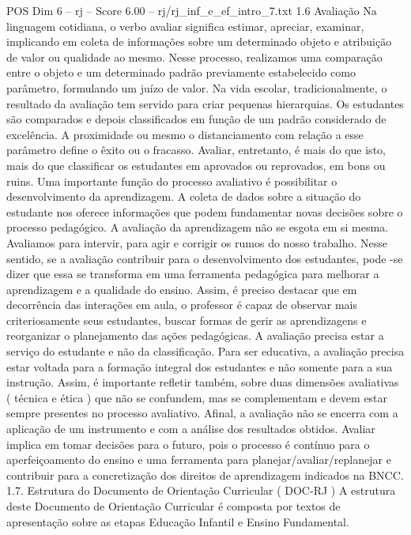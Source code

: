 \begin{textsample}{POS Dim 6 – rj – Score 6.00 – rj/rj\_inf\_e\_ef\_intro\_7.txt}  \label{ex:f6_pos_276}
1.6 Avaliação Na linguagem cotidiana, o verbo avaliar significa estimar, apreciar, examinar, implicando em coleta de informações sobre um determinado objeto e atribuição de valor ou qualidade ao mesmo.
Nesse processo, realizamos uma comparação entre o objeto e um determinado padrão previamente estabelecido como parâmetro, formulando um juízo de valor.
Na vida escolar, tradicionalmente, o resultado da avaliação tem servido para criar pequenas hierarquias.
Os estudantes são comparados e depois classificados em função de um padrão considerado de excelência.
A proximidade ou mesmo o distanciamento com relação a esse parâmetro define o êxito ou o fracasso.
Avaliar, entretanto, é mais do que isto, mais do que classificar os estudantes em aprovados ou reprovados, em bons ou ruins.
Uma importante função do processo avaliativo é possibilitar o desenvolvimento da aprendizagem.
A coleta de dados sobre a situação do estudante nos oferece informações que podem fundamentar novas decisões sobre o processo pedagógico.
A avaliação da aprendizagem não se esgota em si mesma.
Avaliamos para intervir, para agir e corrigir os rumos do nosso trabalho.
Nesse sentido, se a avaliação contribuir para o desenvolvimento dos estudantes, pode -se dizer que essa se transforma em uma ferramenta pedagógica para melhorar a aprendizagem e a qualidade do ensino.
Assim, é preciso destacar que em decorrência das interações em aula, o professor é capaz de observar mais criteriosamente seus estudantes, buscar formas de gerir as aprendizagens e reorganizar o planejamento das ações pedagógicas.
A avaliação precisa estar a serviço do estudante e não da classificação.
Para ser educativa, a avaliação precisa estar voltada para a formação integral dos estudantes e não somente para a sua instrução.
Assim, é importante refletir também, sobre duas dimensões avaliativas ( técnica e ética ) que não se confundem, mas se complementam e devem estar sempre presentes no processo avaliativo.
Afinal, a avaliação não se encerra com a aplicação de um instrumento e com a análise dos resultados obtidos.
Avaliar implica em tomar decisões para o futuro, pois o processo é contínuo para o aperfeiçoamento do ensino e uma ferramenta para planejar/avaliar/replanejar e contribuir para a concretização dos direitos de aprendizagem indicados na BNCC. 1.7.
Estrutura do Documento de Orientação Curricular ( DOC-RJ ) A estrutura deste Documento de Orientação Curricular é composta por textos de apresentação sobre as etapas Educação Infantil e Ensino Fundamental.

\end{textsample}
